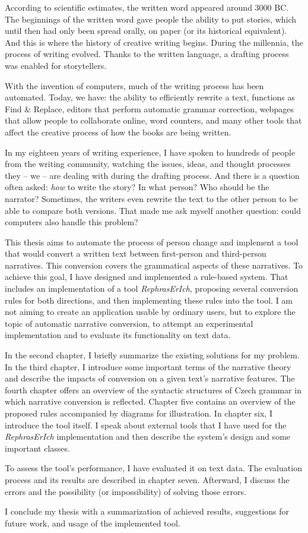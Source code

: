According to scientific estimates, the written word appeared around 3000 BC. The beginnings of the written word gave people the ability to put stories, which until then had only been spread orally, on paper (or its historical equivalent). And this is where the history of creative writing begins. During the millennia, the process of writing evolved. Thanks to the written language, a drafting process was enabled for storytellers.

With the invention of computers, much of the writing process has been automated. Today, we have: the ability to efficiently rewrite a text, functions as Find \& Replace, editors that perform automatic grammar correction, webpages that allow people to collaborate online, word counters, and many other tools that affect the creative process of how the books are being written.

In my eighteen years of writing experience, I have spoken to hundreds of people from the writing community, watching the issues, ideas, and thought processes they -- we -- are dealing with during the drafting process. And there is a question often asked: \emph{how} to write the story? In what person? Who should be the narrator? Sometimes, the writers even rewrite the text to the other person to be able to compare both versions. That made me ask myself another question: could computers also handle this problem?

This thesis aims to automate the process of person change and implement a tool that would convert a written text between first-person and third-person narratives. This conversion covers the grammatical aspects of these narratives. To achieve this goal, I have designed and implemented a rule-based system. That includes an implementation of a tool \emph{RephrasErIch}, proposing several conversion rules for both directions, and then implementing these rules into the tool. I am not aiming to create an application usable by ordinary users, but to explore the topic of automatic narrative conversion, to attempt an experimental implementation and to evaluate its functionality on text data.

In the second chapter, I briefly summarize the existing solutions for my problem. In the third chapter, I introduce some important terms of the narrative theory and describe the impacts of conversion on a given text's narrative features. The fourth chapter offers an overview of the syntactic structures of Czech grammar in which narrative conversion is reflected. Chapter five contains an overview of the proposed rules accompanied by diagrams for illustration. In chapter six, I introduce the tool itself. I speak about external tools that I have used for the \emph{RephrasErIch} implementation and then describe the system's design and some important classes.

To assess the tool's performance, I have evaluated it on text data. The evaluation process and its results are described in chapter seven. Afterward, I discuss the errors and the possibility (or impossibility) of solving those errors.

I conclude my thesis with a summarization of achieved results, suggestions for future work, and usage of the implemented tool.

